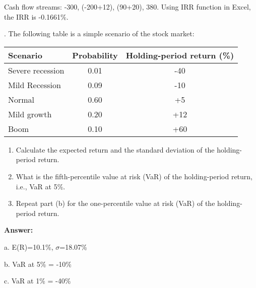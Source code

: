 \documentclass[11.5pt]{article}
\begin{document}
Cash flow streams: -300, (-200+12), (90+20), 380. Using IRR function in Excel, the IRR is -0.1661\%.



\newpage



. The following table is a simple scenario of the stock market:

\begin{table}[h]
	\begin{tabular}{lcc}
		\hline
		Scenario         & Probability & Holding-period   return (\%) \\ \hline
		Severe recession & 0.01        & -40                          \\
		Mild Recession   & 0.09        & -10                          \\
		Normal           & 0.60        & +5                           \\
		Mild growth      & 0.20        & +12                          \\
		Boom             & 0.10        & +60                          \\ \hline
	\end{tabular}
\end{table}


\begin{enumerate}[a]
	\item Calculate the expected return and the standard deviation of the holding-period return.
	
	\item  What is the fifth-percentile value at risk (VaR) of the holding-period return, i.e., VaR at 5\%.
	
	\item  Repeat part (b) for the one-percentile value at risk (VaR) of the holding-period return. 

\end{enumerate}



\vspace{10pt}

\indent \textbf{Answer:} 

a. E(R)=10.1\%, $\sigma$=18.07\%

b. VaR at 5\% = -10\%

c. VaR at 1\% = -40\%
\end{document}
